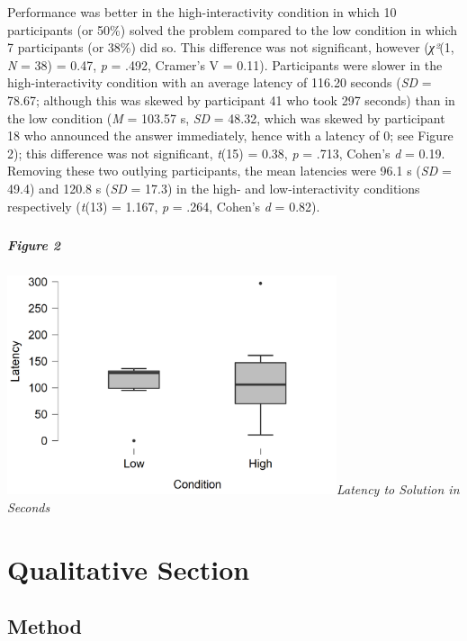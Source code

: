 \documentclass[twocolumn, serif, empirical, authordate]{jote-article}
\begin{document}
{{Performance was better in the high-interactivity condition in which 10 participants (or 50\%) solved the problem compared to the low condition in which 7 participants (or 38\%) did so. This difference was not significant, however (\emph{χ²}(1, \emph{N} = 38) = 0.47, \emph{p} = .492, Cramer's V = 0.11). Participants were slower in the high-interactivity condition with an average latency of 116.20 seconds (\emph{SD} = 78.67; although this was skewed by participant 41 who took 297 seconds) than in the low condition (\emph{M} = 103.57 s, \emph{SD} = 48.32, which was skewed by participant 18 who announced the answer immediately, hence with a latency of 0; see Figure 2); this difference was not significant, \emph{t}(15) = 0.38, \emph{p} = .713, Cohen's \emph{d} = 0.19. Removing these two outlying participants, the mean latencies were 96.1 s (\emph{SD} = 49.4) and 120.8 s (\emph{SD} = 17.3) in the high- and low-interactivity conditions respectively (\emph{t}(13) = 1.167, \emph{p} = .264, Cohen's \emph{d} = 0.82).


\subparagraph{}


\subparagraph{Figure 2}

\includegraphics[width=3.8125in,height=2.54097in]{media/media/image2.png}\emph{Latency to Solution in Seconds} 

\section{Qualitative Section}


\subsection{Method}

}}
\end{document}
